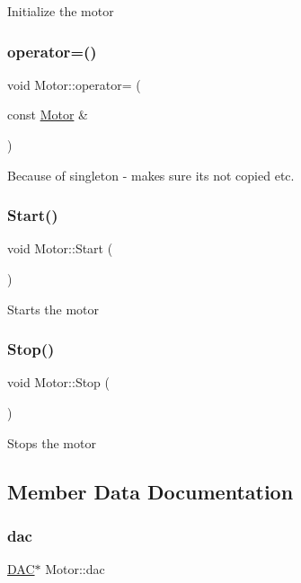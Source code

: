 Initialize the motor \hypertarget{class_motor_afd01e338a159f04706f6a0b95e8e2bd9}{}\label{class_motor_afd01e338a159f04706f6a0b95e8e2bd9} 
\subsubsection{\texorpdfstring{operator=()}{operator=()}}
{\footnotesize\ttfamily void Motor\+::operator= (\begin{DoxyParamCaption}\item[{const \hyperlink{class_motor}{Motor} \&}]{ }\end{DoxyParamCaption})\hspace{0.3cm}{\ttfamily [delete]}}

Because of singleton -\/ makes sure its not copied etc. \hypertarget{class_motor_a4c449b886767bb6f76c3197fd7d072c3}{}\label{class_motor_a4c449b886767bb6f76c3197fd7d072c3} 
\subsubsection{\texorpdfstring{Start()}{Start()}}
{\footnotesize\ttfamily void Motor\+::\+Start (\begin{DoxyParamCaption}{ }\end{DoxyParamCaption})}

Starts the motor \hypertarget{class_motor_a8f0fdb6c977ea11e89281c51534850ca}{}\label{class_motor_a8f0fdb6c977ea11e89281c51534850ca} 
\subsubsection{\texorpdfstring{Stop()}{Stop()}}
{\footnotesize\ttfamily void Motor\+::\+Stop (\begin{DoxyParamCaption}{ }\end{DoxyParamCaption})}

Stops the motor 

\subsection{Member Data Documentation}
\hypertarget{class_motor_ab8662062a02d2177b7694d5ab6ac6851}{}\label{class_motor_ab8662062a02d2177b7694d5ab6ac6851} 
\subsubsection{\texorpdfstring{dac}{dac}}
{\footnotesize\ttfamily \hyperlink{class_d_a_c}{D\+AC}$\ast$ Motor\+::dac\hspace{0.3cm}{\ttfamily [private]}}

